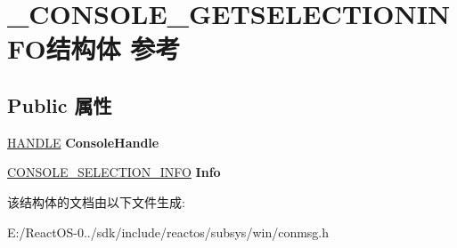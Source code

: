 \hypertarget{struct___c_o_n_s_o_l_e___g_e_t_s_e_l_e_c_t_i_o_n_i_n_f_o}{}\section{\+\_\+\+C\+O\+N\+S\+O\+L\+E\+\_\+\+G\+E\+T\+S\+E\+L\+E\+C\+T\+I\+O\+N\+I\+N\+F\+O结构体 参考}
\label{struct___c_o_n_s_o_l_e___g_e_t_s_e_l_e_c_t_i_o_n_i_n_f_o}
\subsection*{Public 属性}
\begin{DoxyCompactItemize}
\item 
\mbox{\label{struct___c_o_n_s_o_l_e___g_e_t_s_e_l_e_c_t_i_o_n_i_n_f_o_af12d43bbdd8baed1baee01f7a9ade9bf}} 
\hyperlink{interfacevoid}{H\+A\+N\+D\+LE} {\bfseries Console\+Handle}
\item 
\mbox{\label{struct___c_o_n_s_o_l_e___g_e_t_s_e_l_e_c_t_i_o_n_i_n_f_o_a3185f5c098cca489a557ef3fe8ecba15}} 
\hyperlink{struct___c_o_n_s_o_l_e___s_e_l_e_c_t_i_o_n___i_n_f_o}{C\+O\+N\+S\+O\+L\+E\+\_\+\+S\+E\+L\+E\+C\+T\+I\+O\+N\+\_\+\+I\+N\+FO} {\bfseries Info}
\end{DoxyCompactItemize}


该结构体的文档由以下文件生成\+:\begin{DoxyCompactItemize}
\item 
E\+:/\+React\+O\+S-\/0../sdk/include/reactos/subsys/win/conmsg.\+h\end{DoxyCompactItemize}
